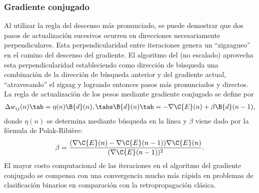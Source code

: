 %
\subsubsection{Gradiente conjugado}
%
Al utilizar la regla del descenso más pronunciado, se puede demostrar
que dos pasos de actualización sucesivos ocurren en direcciones
necesariamente perpendiculares.
Esta perpendicularidad entre iteraciones genera un ``zigzagueo'' en el
camino del descenso del gradiente. El algoritmo del  (no escalado) aprovecha esta perpendicularidad
estableciendo como dirección de búsqueda una combinación de la
dirección de búsqueda anterior y del gradiente actual, ``atravesando''
el zigzag y logrando entonces pasos más pronunciados y directos.
La regla de actualización de los pesos mediante gradiente conjugado
se define por
%
\begin{align}\label{e2:delta-rule-conjugate}
  \Delta w_{ij}(n)\tab=\eta(n)\B{d}(n),
  \tabs \B{d}(n)\tab=-\nabla{\C{E}(n)}+\beta\B{d}(n-1),
\end{align}
%
donde $\eta(n)$ se determina mediante búsqueda en la línea y $\beta$
viene dado por la fórmula de Polak-Ribière:
%
\begin{align}\label{e2:polak-ribiere}
  \beta=
  \frac{(\nabla{\C{E}(n)}-\nabla{\C{E}(n-1)})\nabla{\C{E}(n)}}{(\nabla{\C{E}(n-1)})^2}.
\end{align}
%
El mayor costo computacional de las iteraciones en el algoritmo del
gradiente conjugado se compensa con una convergencia mucho más rápida
en problemas de clasificación binarios en comparación con la
retropropagación clásica.
